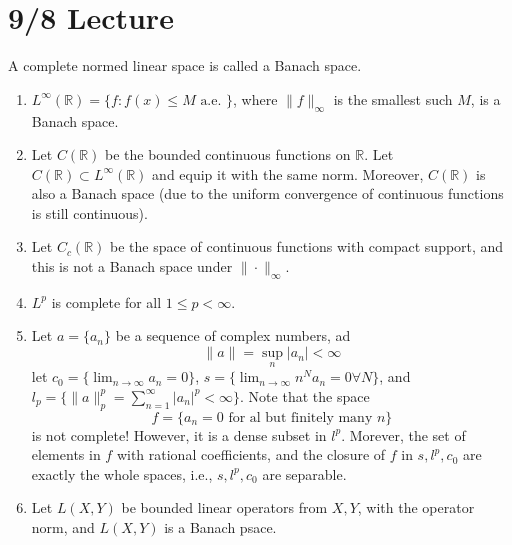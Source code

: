 \documentclass[openany]{book}
\newcommand{\R}{\mathbb{R}}
\begin{document}
\section{9/8 Lecture}
\begin{defn}
    A complete normed linear space is called a Banach space.
\end{defn}
\begin{example}
    \begin{enumerate}
        \item $L^\infty(\R)=\{f:f(x)\leq M \text{ a.e. }\}$, where $\|f\|_\infty$ is the smallest such $M$, is a Banach space.
        \item Let $C(\R)$ be the bounded continuous functions on $\R$. Let $C(\R)\subset L^\infty(\R)$ and equip it with the same norm. Moreover, $C(\R)$ is also a Banach space (due to the uniform convergence of continuous functions is still continuous).
        \item Let $C_c(\R)$ be the space of continuous functions with compact support, and this is not a Banach space under $\|\cdot\|_\infty$.
        \item $L^p$ is complete for all $1\leq p<\infty$.
        \item Let $a=\{a_n\}$ be a sequence of complex numbers, ad 
        \begin{equation*}
            \|a\|=\sup_n|a_n|<\infty
        \end{equation*}
        let $c_0=\{\lim_{n\to\infty}a_n=0\}$, $s=\{\lim_{n\to\infty}n^Na_n=0 \forall N\}$, and $l_p=\{\|a\|_p^p=\sum_{n=1}^\infty|a_n|^p<\infty\}$. Note that the space 
        \begin{equation*}
            f=\{a_n=0 \text{ for al but finitely many $n$}\}
        \end{equation*}
        is not complete! However, it is a dense subset in $l^p$. Morever, the set of elements in $f$ with rational coefficients, and the closure of $f$ in $s, l^p, c_0$ are exactly the whole spaces, i.e., $s,l^p, c_0$ are separable.
        \item Let $L(X,Y)$ be bounded linear operators from $X,Y$, with the operator norm, and $L(X,Y)$ is a Banach psace.
    \end{enumerate}
\end{example}
\end{document}
